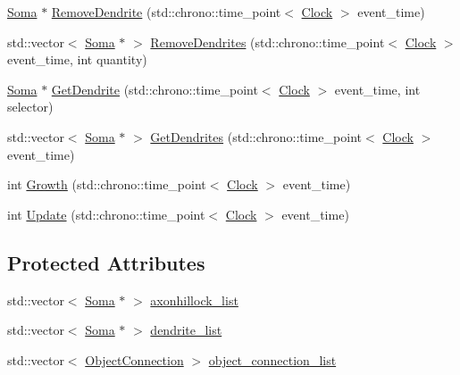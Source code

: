 \begin{DoxyCompactItemize}
\item 
\mbox{\hyperlink{classSoma}{Soma}} $\ast$ \mbox{\hyperlink{classSoma_a85c7d4b41486182c9528f5c43beaf7fd}{Remove\+Dendrite}} (std\+::chrono\+::time\+\_\+point$<$ \mbox{\hyperlink{universe_8h_a0ef8d951d1ca5ab3cfaf7ab4c7a6fd80}{Clock}} $>$ event\+\_\+time)
\item 
std\+::vector$<$ \mbox{\hyperlink{classSoma}{Soma}} $\ast$ $>$ \mbox{\hyperlink{classSoma_ad15baed4b2f5dab6f93e5df8fd1f7b23}{Remove\+Dendrites}} (std\+::chrono\+::time\+\_\+point$<$ \mbox{\hyperlink{universe_8h_a0ef8d951d1ca5ab3cfaf7ab4c7a6fd80}{Clock}} $>$ event\+\_\+time, int quantity)
\item 
\mbox{\hyperlink{classSoma}{Soma}} $\ast$ \mbox{\hyperlink{classSoma_ab86537170d550cda0e7da080f7640f84}{Get\+Dendrite}} (std\+::chrono\+::time\+\_\+point$<$ \mbox{\hyperlink{universe_8h_a0ef8d951d1ca5ab3cfaf7ab4c7a6fd80}{Clock}} $>$ event\+\_\+time, int selector)
\item 
std\+::vector$<$ \mbox{\hyperlink{classSoma}{Soma}} $\ast$ $>$ \mbox{\hyperlink{classSoma_afdb0e40855f31f2d9a48f3b13c01b599}{Get\+Dendrites}} (std\+::chrono\+::time\+\_\+point$<$ \mbox{\hyperlink{universe_8h_a0ef8d951d1ca5ab3cfaf7ab4c7a6fd80}{Clock}} $>$ event\+\_\+time)
\item 
int \mbox{\hyperlink{classSoma_aa6162ca8a98a14cf49ba8310db129d47}{Growth}} (std\+::chrono\+::time\+\_\+point$<$ \mbox{\hyperlink{universe_8h_a0ef8d951d1ca5ab3cfaf7ab4c7a6fd80}{Clock}} $>$ event\+\_\+time)
\item 
int \mbox{\hyperlink{classSoma_a211587ef21a7932c2f8f0345b1d32f57}{Update}} (std\+::chrono\+::time\+\_\+point$<$ \mbox{\hyperlink{universe_8h_a0ef8d951d1ca5ab3cfaf7ab4c7a6fd80}{Clock}} $>$ event\+\_\+time)
\end{DoxyCompactItemize}
\subsection*{Protected Attributes}
\begin{DoxyCompactItemize}
\item 
std\+::vector$<$ \mbox{\hyperlink{classSoma}{Soma}} $\ast$ $>$ \mbox{\hyperlink{classSoma_af93902336cddb974b282aef8b7b4243c}{axonhillock\+\_\+list}}
\item 
std\+::vector$<$ \mbox{\hyperlink{classSoma}{Soma}} $\ast$ $>$ \mbox{\hyperlink{classSoma_ab2d13b0adf2d10c242df0b8e62bcc01a}{dendrite\+\_\+list}}
\item 
std\+::vector$<$ \mbox{\hyperlink{structSoma_1_1ObjectConnection}{Object\+Connection}} $>$ \mbox{\hyperlink{classSoma_a84739acd533862b115bd5cbe56da6c98}{object\+\_\+connection\+\_\+list}}
\end{DoxyCompactItemize}

